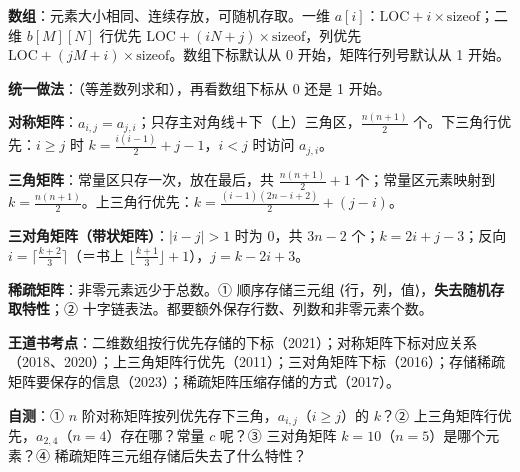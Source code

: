 \documentclass[10.5pt,a4paper,oneside]{article}
\newcommand{\hlred}[1]{\textcolor{wdred}{\bfseries #1}}
\newcommand{\uln}[1]{\CJKunderline[format=\color{wdred},thickness=0.9pt,depth=0.28em]{#1}}
\begin{document}
\begin{summarybox}

\textbf{数组}：元素大小相同、连续存放，可随机存取。一维
\(a[i]\)：\(\text{LOC} + i \times \text{sizeof}\)；二维 \(b[M][N]\)
行优先 \(\text{LOC} + (iN + j) \times \text{sizeof}\)，列优先
\(\text{LOC} + (jM + i) \times \text{sizeof}\)。数组下标默认从 0
开始，矩阵行列号默认从 1 开始。

\textbf{统一做法}：\uln{数出前面有几个元素}（等差数列求和），再看数组下标从
0 还是 1 开始。

\textbf{对称矩阵}：\(a_{i,j} = a_{j,i}\)；只存主对角线＋下（上）三角区，\(\frac{n(n+1)}{2}\)
个。下三角行优先：\(i \ge j\) 时
\(k = \frac{i(i-1)}{2} + j - 1\)，\(i<j\) 时访问 \(a_{j,i}\)。

\textbf{三角矩阵}：常量区只存一次，放在最后，共 \(\frac{n(n+1)}{2} + 1\)
个；常量区元素映射到
\(k = \frac{n(n+1)}{2}\)。上三角行优先：\(k = \frac{(i-1)(2n-i+2)}{2} + (j-i)\)。

\textbf{三对角矩阵（带状矩阵）}：\(|i-j|>1\) 时为 0，共 \(3n-2\)
个；\(k = 2i + j - 3\)；反向 \(i = \lceil \frac{k+2}{3} \rceil\)（＝书上
\(\lfloor \frac{k+1}{3} \rfloor + 1\)），\(j = k - 2i + 3\)。

\textbf{稀疏矩阵}：非零元素远少于总数。① 顺序存储三元组
⟨行，列，值⟩，\hlred{失去随机存取特性}；②
十字链表法。都要额外保存行数、列数和非零元素个数。

\textbf{王道书考点}：二维数组按行优先存储的下标（2021）；对称矩阵下标对应关系（2018、2020）；上三角矩阵行优先（2011）；三对角矩阵下标（2016）；存储稀疏矩阵要保存的信息（2023）；稀疏矩阵压缩存储的方式（2017）。

\textbf{自测}：① \(n\)
阶对称矩阵按列优先存下三角，\(a_{i,j}\)（\(i \ge j\)）的 \(k\)？②
上三角矩阵行优先，\(a_{2,4}\)（\(n=4\)）存在哪？常量 \(c\) 呢？③
三对角矩阵 \(k=10\)（\(n=5\)）是哪个元素？④
稀疏矩阵三元组存储后失去了什么特性？

\end{summarybox}
\end{document}
